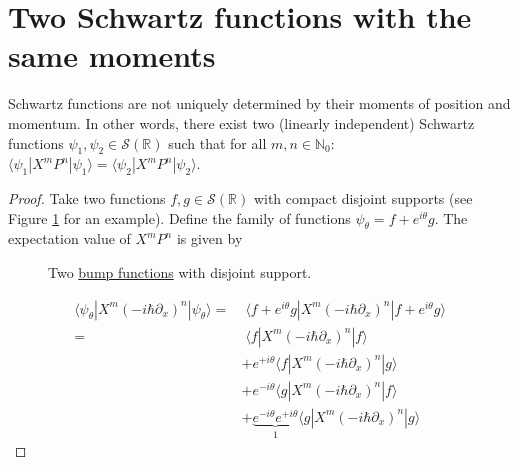 \documentclass{techbrief}
\begin{document}
\section{Two Schwartz functions with the same moments}
\begin{thrm}
    Schwartz functions are not uniquely determined by their moments of position and momentum. In other words, there exist two (linearly independent) Schwartz functions $\psi_1, \psi_2 \in \mathcal{S}(\mathbb{R})$ such that for all $m, n \in \mathbb{N}_0$: $\langle \psi_1 | X^m P^n | \psi_1 \rangle = \langle \psi_2 | X^m P^n | \psi_2 \rangle$.
\end{thrm}
\begin{proof}
    Take two functions $f, g \in \mathcal{S}(\mathbb{R})$ with compact disjoint supports (see Figure \ref{fig:bumps} for an example). Define the family of functions $\psi_\theta = f + e^{i \theta} g$. The expectation value of $X^m P^n$ is given by
    \begin{figure}[h]
        \centering
        \caption{Two \href{https://en.wikipedia.org/wiki/Bump_function}{bump functions} with disjoint support.}
        \label{fig:bumps}
    \end{figure}
    \begin{equation}
        \begin{split}
            \langle \psi_\theta | X^m (-i \hbar \partial_x)^n | \psi_\theta \rangle =&\; \langle f + e^{i \theta} g | X^m (-i \hbar \partial_x)^n | f + e^{i \theta} g \rangle \\
            =&\; \langle f  | X^m (-i \hbar \partial_x)^n | f \rangle \\
            &+ e^{+i \theta} \langle f | X^m (-i \hbar \partial_x)^n | g \rangle \\
            &+ e^{-i \theta} \langle g | X^m (-i \hbar \partial_x)^n | f \rangle \\
            &+ \underbrace{e^{-i \theta} e^{+i \theta}}_{1} \langle g | X^m (-i \hbar \partial_x)^n | g \rangle

\end{split}
\end{equation}
\end{proof}
\end{document}
